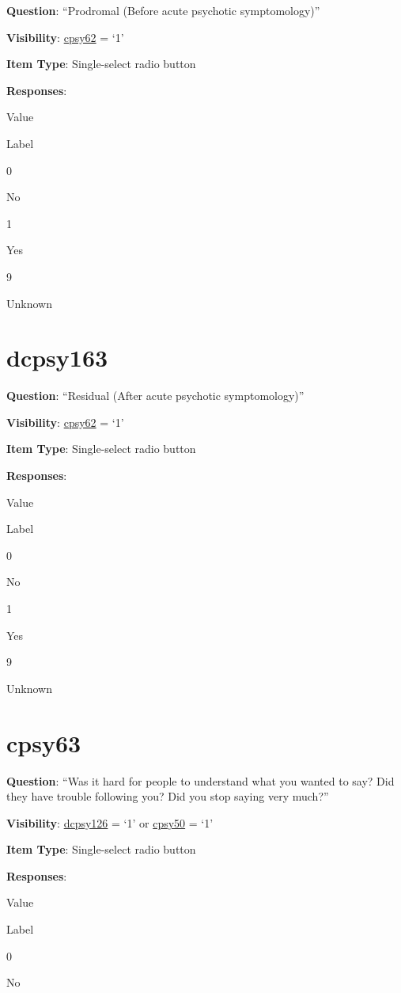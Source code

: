 \documentclass[]{book}
\begin{document}
\textbf{Question}: ``Prodromal (Before acute psychotic symptomology)''

\textbf{Visibility}: \protect\hyperlink{cpsy62}{cpsy62} = `1'

\textbf{Item Type}: Single-select radio button

\textbf{Responses}:

Value

Label

0

No

1

Yes

9

Unknown

\hypertarget{dcpsy163}{%
\section{dcpsy163}\label{dcpsy163}}

\textbf{Question}: ``Residual (After acute psychotic symptomology)''

\textbf{Visibility}: \protect\hyperlink{cpsy62}{cpsy62} = `1'

\textbf{Item Type}: Single-select radio button

\textbf{Responses}:

Value

Label

0

No

1

Yes

9

Unknown

\hypertarget{cpsy63}{%
\section{cpsy63}\label{cpsy63}}

\textbf{Question}: ``Was it hard for people to understand what you wanted to say? Did they have trouble following you? Did you stop saying very much?''

\textbf{Visibility}: \protect\hyperlink{dcpsy126}{dcpsy126} = `1' or \protect\hyperlink{cpsy50}{cpsy50} = `1'

\textbf{Item Type}: Single-select radio button

\textbf{Responses}:

Value

Label

0

No
\end{document}
